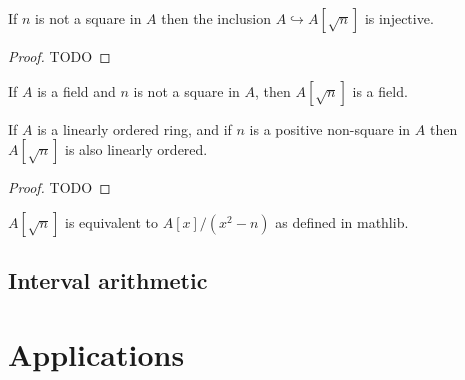 \begin{lemma}
  \label{thm:adjoinInjective}
  If $n$ is not a square in $A$ then the inclusion $A \hookrightarrow
  A[\sqrt{n}]$ is injective.
\end{lemma}

\begin{proof}
  TODO
\end{proof}

\begin{theorem}
  \label{thm:adjoinField}
  \leanok
  If $A$ is a field and $n$ is not a square in $A$, then $A[\sqrt{n}]$ is a
  field.
\end{theorem}

\begin{theorem}
  \label{thm:adjoinOrder}

  If $A$ is a linearly ordered ring, and if $n$ is a positive non-square in $A$
  then $A[\sqrt{n}]$ is also linearly ordered.
\end{theorem}
\begin{proof}
  TODO
\end{proof}

\begin{lemma}
  \label{thm:mathlibAdjoin}
  $A[\sqrt{n}]$ is equivalent to $A[x] / (x^2 - n)$ as defined in mathlib.
\end{lemma}

\subsection{Interval arithmetic}


\section{Applications}

